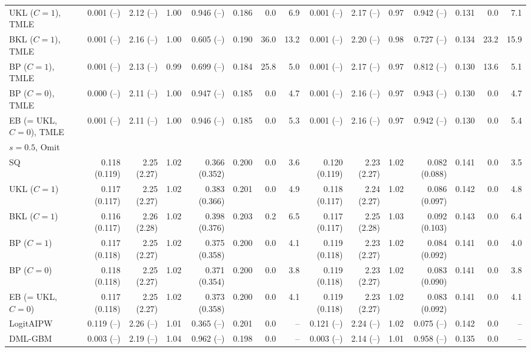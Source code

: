 \begin{tabular}{lrrrrrrrrrrrrrr}
UKL ($C=1$), TMLE & 0.001 (--) & 2.12 (--) & 1.00 & 0.946 (--) & 0.186 & 0.0 & 6.9 & 0.001 (--) & 2.17 (--) & 0.97 & 0.942 (--) & 0.131 & 0.0 & 7.1 \\
BKL ($C=1$), TMLE & 0.001 (--) & 2.16 (--) & 1.00 & 0.605 (--) & 0.190 & 36.0 & 13.2 & 0.001 (--) & 2.20 (--) & 0.98 & 0.727 (--) & 0.134 & 23.2 & 15.9 \\
BP ($C=1$), TMLE & 0.001 (--) & 2.13 (--) & 0.99 & 0.699 (--) & 0.184 & 25.8 & 5.0 & 0.001 (--) & 2.17 (--) & 0.97 & 0.812 (--) & 0.130 & 13.6 & 5.1 \\
BP ($C=0$), TMLE & 0.000 (--) & 2.11 (--) & 1.00 & 0.947 (--) & 0.185 & 0.0 & 4.7 & 0.001 (--) & 2.16 (--) & 0.97 & 0.943 (--) & 0.130 & 0.0 & 4.7 \\
EB (= UKL, $C=0$), TMLE & 0.001 (--) & 2.11 (--) & 1.00 & 0.946 (--) & 0.185 & 0.0 & 5.3 & 0.001 (--) & 2.16 (--) & 0.97 & 0.942 (--) & 0.130 & 0.0 & 5.4 \\
\multicolumn{15}{l}{$s=0.5$, Omit} \\
SQ & 0.118 (0.119) & 2.25 (2.27) & 1.02 & 0.366 (0.352) & 0.200 & 0.0 & 3.6 & 0.120 (0.119) & 2.23 (2.27) & 1.02 & 0.082 (0.088) & 0.141 & 0.0 & 3.5 \\
UKL ($C=1$) & 0.117 (0.117) & 2.25 (2.27) & 1.02 & 0.383 (0.366) & 0.201 & 0.0 & 4.9 & 0.118 (0.117) & 2.24 (2.27) & 1.02 & 0.086 (0.097) & 0.142 & 0.0 & 4.8 \\
BKL ($C=1$) & 0.116 (0.117) & 2.26 (2.28) & 1.02 & 0.398 (0.376) & 0.203 & 0.2 & 6.5 & 0.117 (0.117) & 2.25 (2.28) & 1.03 & 0.092 (0.103) & 0.143 & 0.0 & 6.4 \\
BP ($C=1$) & 0.117 (0.118) & 2.25 (2.27) & 1.02 & 0.375 (0.358) & 0.200 & 0.0 & 4.1 & 0.119 (0.118) & 2.23 (2.27) & 1.02 & 0.084 (0.092) & 0.141 & 0.0 & 4.0 \\
BP ($C=0$) & 0.118 (0.118) & 2.25 (2.27) & 1.02 & 0.371 (0.354) & 0.200 & 0.0 & 3.8 & 0.119 (0.118) & 2.23 (2.27) & 1.02 & 0.083 (0.090) & 0.141 & 0.0 & 3.8 \\
EB (= UKL, $C=0$) & 0.117 (0.118) & 2.25 (2.27) & 1.02 & 0.373 (0.358) & 0.200 & 0.0 & 4.1 & 0.119 (0.118) & 2.23 (2.27) & 1.02 & 0.083 (0.092) & 0.141 & 0.0 & 4.1 \\
LogitAIPW & 0.119 (--) & 2.26 (--) & 1.01 & 0.365 (--) & 0.201 & 0.0 & -- & 0.121 (--) & 2.24 (--) & 1.02 & 0.075 (--) & 0.142 & 0.0 & -- \\
DML-GBM & 0.003 (--) & 2.19 (--) & 1.04 & 0.962 (--) & 0.198 & 0.0 & -- & 0.003 (--) & 2.14 (--) & 1.01 & 0.958 (--) & 0.135 & 0.0 & -- \\

\end{tabular}
